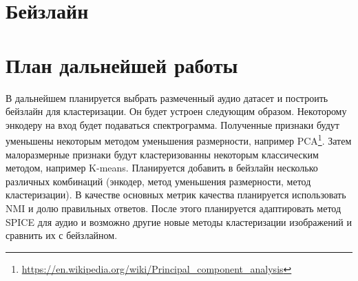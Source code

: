 \documentclass[a4paper,12pt]{extarticle}
\begin{document}
\section{Бейзлайн}

\begin{table}[ht]
    \footnotesize
	\centering

\end{table}

\section{План дальнейшей работы}

В дальнейшем планируется выбрать размеченный аудио 
датасет и построить бейзлайн для кластеризации. Он будет 
устроен следующим образом. Некоторому энкодеру на вход 
будет подаваться спектрограмма. Полученные признаки будут 
уменьшены некоторым методом уменьшения размерности, например
PCA\footnote{\url{https://en.wikipedia.org/wiki/Principal\_component\_analysis}}. Затем малоразмерные признаки будут 
кластеризованны некоторым классическим методом, например 
K-means. Планируется добавить в бейзлайн несколько различных
комбинаций (энкодер, метод уменьшения размерности, метод 
кластеризации). В качестве основных метрик качества планируется
использовать NMI и долю правильных ответов. После этого 
планируется адаптировать метод SPICE для аудио и возможно 
другие новые методы кластеризации изображений и сравнить их 
с бейзлайном. 
	
\newpage 
\printbibliography[heading=bibintoc] 
	
\end{document}
